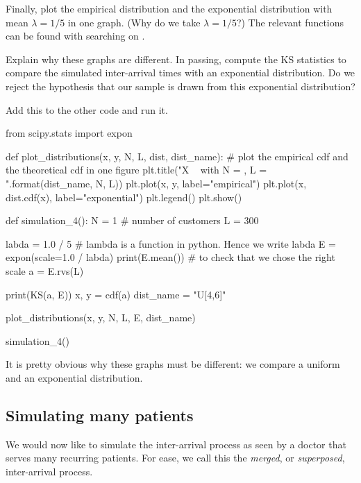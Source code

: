 \begin{exercise}
  Finally, plot the empirical distribution and the exponential distribution with mean $\lambda=1/5$ in one graph.
  (Why do we take $\lambda=1/5$?) The relevant  functions can be found with searching on .

  Explain why these graphs are different.
  In passing, compute the KS statistics to compare the simulated inter-arrival times with an exponential distribution.
  Do we reject the hypothesis that our sample is drawn from this exponential distribution?

\begin{solution}
Add this to the other code and run it.
\begin{pyverbatim}
from scipy.stats import expon

def plot_distributions(x, y, N, L, dist, dist_name):
    # plot the empirical cdf and the theoretical cdf in one figure
    plt.title("X ~ {} with N = {}, L = {}".format(dist_name, N, L))
    plt.plot(x, y, label="empirical")
    plt.plot(x, dist.cdf(x), label="exponential")
    plt.legend()
    plt.show()

def simulation_4():
    N = 1  # number of customers
    L = 300

    labda = 1.0 / 5  # lambda is a function in python. Hence we write labda
    E = expon(scale=1.0 / labda)
    print(E.mean()) # to check that we chose the right scale
    a = E.rvs(L)

    print(KS(a, E))
    x, y = cdf(a)
    dist_name = "U[4,6]"

    plot_distributions(x, y, N, L, E, dist_name)

simulation_4()
\end{pyverbatim}

It is pretty obvious why these graphs must be different: we compare a uniform and an exponential distribution.
\end{solution}
\end{exercise}


\subsection{Simulating many patients}
\label{sec:simul-many-cust}

We would now like to simulate the inter-arrival process as seen by a doctor that serves many recurring patients.
For ease, we call this the \emph{merged}, or \emph{superposed}, inter-arrival process.

